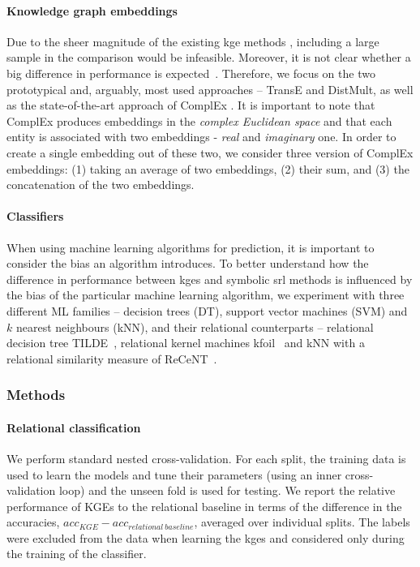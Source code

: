 \paragraph{Knowledge graph embeddings}
Due to the sheer magnitude of the existing \gls{kge} methods \cite{EmbeddingsOverview}, including a large sample in the comparison would be infeasible.
Moreover, it is not clear whether a big difference in performance is expected~\cite{DBLP:conf/rep4nlp/KadlecBK17}.
Therefore, we focus on the two prototypical and, arguably, most used approaches -- TransE and DistMult, as well as the state-of-the-art approach of ComplEx \cite{trouillon2016complex}.
It is important to note that ComplEx produces embeddings in the \textit{complex Euclidean space} and that each entity is associated with two embeddings - \textit{real} and \textit{imaginary} one.
In order to create a single embedding out of these two, we consider three version of ComplEx embeddings: (1) taking an average of two embeddings, (2) their sum, and (3) the concatenation of the two embeddings.




\paragraph{Classifiers}
When using machine learning algorithms for prediction, it is important to consider the bias an algorithm introduces.
To better understand how the difference in performance between \gls{kge}s and symbolic \gls{srl} methods is influenced by the bias of the particular machine learning algorithm, we experiment with three different ML families -- decision trees (DT), support vector machines (SVM) and $k$ nearest neighbours (kNN), and their relational counterparts -- relational decision tree TILDE~\cite{Blockeel1998285}, relational kernel machines \gls{kfoil}~\cite{Landwehr:2006:KLS:1597538.1597601} and kNN with a relational similarity measure of ReCeNT~\cite{Dumancic2017a}.










\subsubsection{Methods}


\paragraph{Relational classification}
We perform standard nested cross-validation.
For each split, the training data is used to learn the models and tune their parameters (using an inner cross-validation loop) and the unseen fold is used for testing.
We report the relative performance of KGEs to the relational baseline in terms of the difference in the accuracies, $acc_{KGE} - acc_{relational~ baseline}$, averaged over individual splits.
The labels were excluded from the data when learning the \gls{kge}s and considered only during the training of the classifier.


